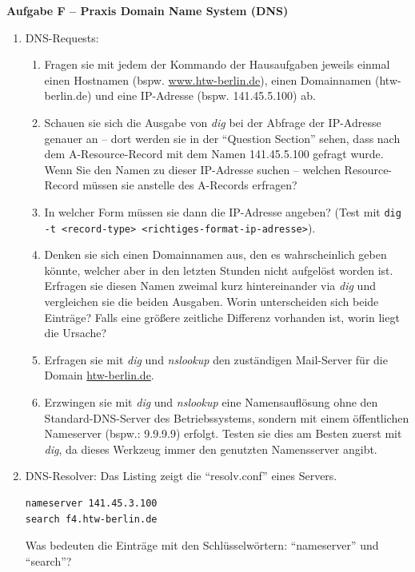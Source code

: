 \documentclass[paper=a4,fontsize=11pt]{scrartcl}%
\numberwithin{equation}{section}
\begin{document}
\begin{center}\Large{\textbf{Aufgabe F -- Praxis Domain Name System (DNS)}}\end{center}\vskip0.25in
\begin{enumerate}
	\item DNS-Requests:
\begin{enumerate}[label=(\alph*)]
		\item Fragen sie mit jedem der Kommando der Hausaufgaben jeweils einmal einen Hostnamen (bspw. \url{www.htw-berlin.de}), einen Domainnamen (htw-berlin.de) und eine IP-Adresse (bspw. 141.45.5.100) ab.
		\item Schauen sie sich die Ausgabe von \emph{dig} bei der Abfrage der IP-Adresse genauer an -- dort werden sie in der \enquote{Question Section} sehen, dass nach dem A-Resource-Record mit dem Namen 141.45.5.100 gefragt wurde. Wenn Sie den Namen zu dieser IP-Adresse suchen -- welchen Resource-Record müssen sie anstelle des A-Records erfragen? 
		\item In welcher Form müssen sie dann die IP-Adresse angeben? (Test mit \texttt{dig -t <record-type> <richtiges-format-ip-adresse>}).
		\item Denken sie sich einen Domainnamen aus, den es wahrscheinlich geben könnte, welcher aber in den letzten Stunden nicht aufgelöst worden ist. Erfragen sie diesen Namen zweimal kurz hintereinander via \emph{dig} und vergleichen sie die beiden Ausgaben. Worin unterscheiden sich beide Einträge? Falls eine größere zeitliche Differenz vorhanden ist, worin liegt die Ursache?
		\item Erfragen sie mit \emph{dig} und \emph{nslookup} den zuständigen Mail-Server für die Domain \url{htw-berlin.de}.
		\item Erzwingen sie mit \emph{dig} und \emph{nslookup} eine Namensauflösung ohne den Standard-DNS-Server des Betriebssystems, sondern mit einem öffentlichen Nameserver (bspw.: 9.9.9.9) erfolgt. Testen sie dies am Besten zuerst mit \emph{dig}, da dieses Werkzeug immer den genutzten Namensserver angibt.
	\end{enumerate}
	\item DNS-Resolver: Das Listing zeigt die \enquote{resolv.conf} eines Servers. 
	\begin{lstlisting}[style=Bash, language=Bash]
nameserver 141.45.3.100
search f4.htw-berlin.de
\end{lstlisting} \label{dns}
Was bedeuten die Einträge mit den Schlüsselwörtern: \enquote{nameserver} und \enquote{search}?
\end{enumerate}

\printbibliography
\end{document}

